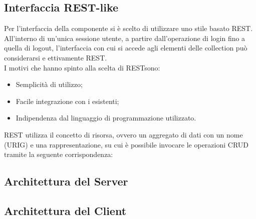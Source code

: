 	\subsection{Interfaccia REST-like}
	\label{3.3}
	Per l'interfaccia della componente  si è scelto di utilizzare uno stile basato REST. All'interno di un’unica sessione utente, a partire dall’operazione di login fino a quella di logout, l'interfaccia con cui si accede agli elementi delle collection può considerarsi e ettivamente REST.\\
I motivi che hanno spinto alla scelta di RESTsono:
\begin{itemize}
\item Semplicità di utilizzo;
\item Facile integrazione con i  esistenti; 
\item Indipendenza dal linguaggio di programmazione utilizzato.
\end{itemize}	
REST utilizza il concetto di risorsa, ovvero un aggregato di dati con un nome (URIG) e una rappresentazione, su cui è possibile invocare le operazioni CRUD tramite la seguente corrispondenza:
	\subsection{Architettura del Server}
	\label{3.4}
	\subsection{Architettura del Client}
	\label{3.5}
